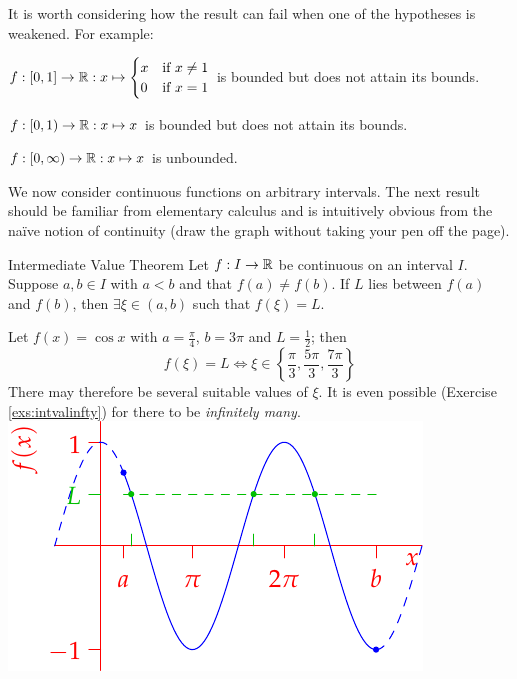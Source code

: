It is worth considering how the result can fail when one of the hypotheses is weakened. For example:
\begin{description}\itemsep0pt
	\item[\normalfont\emph{$f$ discontinuous}] $f:[0,1]\to\mathbb{R}:x\mapsto
	\begin{cases}
		x&\text{if }x\neq 1\\
		0&\text{if }x=1
	\end{cases}$
	is bounded but does not attain its bounds.
	\item[\normalfont\emph{$\dom(f)$ not closed}] $f:[0,1)\to\mathbb{R}:x\mapsto x$ is bounded but does not attain its bounds.
	\item[\normalfont\emph{$\dom(f)$ not bounded}] $f:[0,\infty)\to\mathbb{R}:x\mapsto x$ is unbounded.
\end{description}

\medskip


We now consider continuous functions on arbitrary intervals. The next result should be familiar from elementary calculus and is intuitively obvious from the naïve notion of continuity (draw the graph without taking your pen off the page).

\begin{thm}{Intermediate Value Theorem}{}
	Let $f:I\to\mathbb{R}$ be continuous on an interval $I$. Suppose $a,b\in I$ with $a<b$ and that $f(a)\neq f(b)$. If $L$ lies between $f(a)$ and $f(b)$, then $\exists \xi\in(a,b)$ such that $f(\xi)=L$.
\end{thm}


\begin{example}[lower separated=false, sidebyside, sidebyside align=top seam, sidebyside gap=0pt, righthand width=0.45\linewidth]{}{}
	Let $f(x)=\cos x$ with $a=\frac\pi 4$, $b=3\pi$ and $L=\frac 12$; then
	\[
		f(\xi)=L\iff \xi\in\left\{\frac\pi 3,\frac{5\pi}3,\frac{7\pi}3\right\}
	\]
	There may therefore be several suitable values of $\xi$. It is even possible (Exercise \ref{exs:intvalinfty}) for there to be \emph{infinitely many}.
	\tcblower
	\flushright\includegraphics{intval2}
\end{example}



